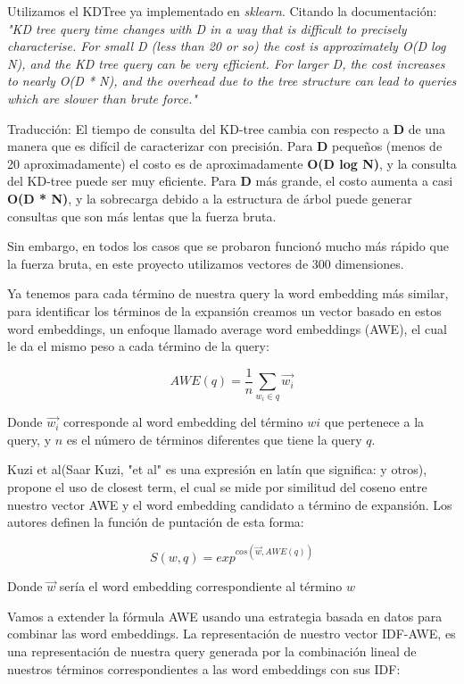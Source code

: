 \documentclass{llncs}
\begin{document}
Utilizamos el KDTree ya implementado en \textit{sklearn}. Citando la documentación:  
\textit{"KD tree query time changes with D in a way that is difficult to precisely characterise. For small D (less than 20 or so) the cost is approximately O(D log N), and the KD tree query can be very efficient. For larger D, the cost increases to nearly O(D * N), and the overhead due to the tree structure can lead to queries which are slower than brute force."}

Traducción:
El tiempo de consulta del KD-tree cambia con respecto a \textbf{D} de una manera que es difícil de caracterizar con precisión. Para \textbf{D} pequeños (menos de 20 aproximadamente) el costo es de aproximadamente \textbf{O(D log N)}, y la consulta del KD-tree puede ser muy eficiente. Para \textbf{D} más grande, el costo aumenta a casi \textbf{O(D * N)}, y la sobrecarga debido a la estructura de árbol puede generar consultas que son más lentas que la fuerza bruta.


Sin embargo, en todos los casos que se probaron funcionó mucho más rápido que la fuerza bruta, en este proyecto utilizamos vectores de 300 dimensiones.


Ya tenemos para cada término de nuestra query la word embedding más similar, para identificar los términos de la expansión creamos un vector basado en estos word embeddings, un enfoque llamado average word embeddings (AWE), el cual le da el mismo peso a cada término de la query:


$$AWE(q) = \frac{1}{n} \sum_{w_i \in q} \vec{w_i}$$


Donde $\vec{w_i}$ corresponde al word embedding del término $wi$ que pertenece a la query, y $n$ es el número de términos diferentes que tiene la query $q$.


Kuzi et al(Saar Kuzi, "et al" es una expresión en latín que significa: y otros), propone el uso de closest term, el cual se mide por similitud del coseno entre nuestro vector AWE y el word embedding candidato a término de expansión. Los autores definen la función de puntación de esta forma:


$$ S(w, q) = exp^{\displaystyle{cos(\vec{w}, AWE(q))}} $$


Donde $\vec{w}$ sería el word embedding correspondiente al término $w$


Vamos a extender la fórmula AWE usando una estrategia basada en datos para combinar las word embeddings. La representación de nuestro vector IDF-AWE, es una representación de nuestra query generada por la combinación lineal de nuestros términos correspondientes a las word embeddings con sus IDF:
\end{document}
